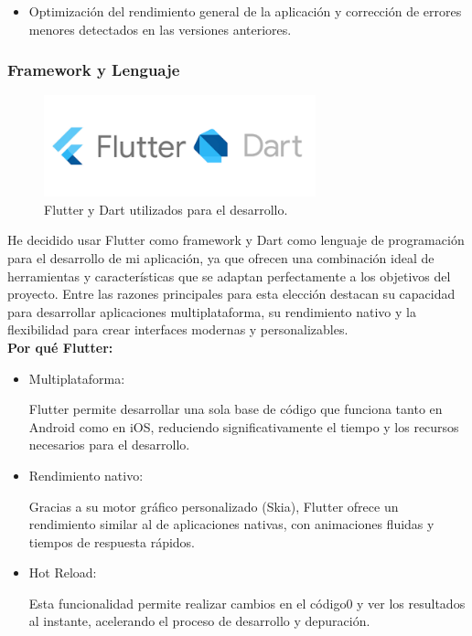 \documentclass{article}
\begin{document}
\begin{flushleft}
\begin{itemize}
\begin{itemize}
    
    \item Optimización del rendimiento general de la aplicación y corrección de errores menores detectados en las versiones anteriores.
\end{itemize}

\end{itemize}

\subsubsection{Framework y Lenguaje}
\begin{figure}[H]
    \centering
    \includegraphics[width=0.7\textwidth]{TFG/img/flutter y dart.png}
    \caption{Flutter y Dart utilizados para el desarrollo.}
    \label{fig:flutter_dart}
\end{figure}
He decidido usar Flutter como framework y Dart como lenguaje de programación para el desarrollo de mi aplicación, ya que ofrecen una combinación ideal de herramientas y características que se adaptan perfectamente a los objetivos del proyecto. Entre las razones principales para esta elección destacan su capacidad para desarrollar aplicaciones multiplataforma, su rendimiento nativo y la flexibilidad para crear interfaces modernas y personalizables.\\
    
\textbf{Por qué Flutter:}
\begin{itemize}
    \item  Multiplataforma:

Flutter permite desarrollar una sola base de código que funciona tanto en Android como en iOS, reduciendo significativamente el tiempo y los recursos necesarios para el desarrollo.
\item Rendimiento nativo:

Gracias a su motor gráfico personalizado (Skia), Flutter ofrece un rendimiento similar al de aplicaciones nativas, con animaciones fluidas y tiempos de respuesta rápidos.
\item Hot Reload:

Esta funcionalidad permite realizar cambios en el código0 y ver los resultados al instante, acelerando el proceso de desarrollo y depuración.


\end{itemize}
\end{flushleft}
\end{document}
